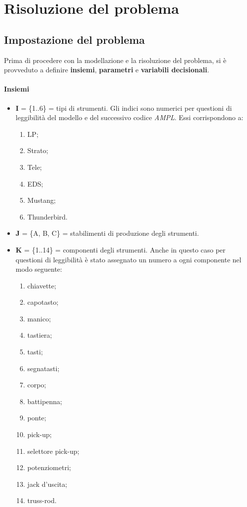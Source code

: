 \newpage
\section{Risoluzione del problema}
\subsection{Impostazione del problema}
Prima di procedere con la modellazione e la risoluzione del problema, si è provveduto a definire \textbf{insiemi}, \textbf{parametri} e \textbf{variabili decisionali}.
\paragraph*{Insiemi} 
\begin{itemize}
\item[] \textbf{I} = \{1..6\} = tipi di strumenti. Gli indici sono numerici per questioni di leggibilità del modello e del successivo codice \textit{AMPL}. Essi corrispondono a:
\begin{enumerate}
\item LP;
\item Strato;
\item Tele;
\item EDS;
\item Mustang;
\item Thunderbird.
\end{enumerate}
\item[] \textbf{J} = \{A, B, C\} = stabilimenti di produzione degli strumenti. 
\item[] \textbf{K} = \{1..14\} = componenti degli strumenti. Anche in questo caso per questioni di leggibilità è stato assegnato un numero a ogni componente nel modo seguente:
\begin{enumerate}
\item chiavette;
\item capotasto;
\item manico;
\item tastiera;
\item tasti;
\item segnatasti;
\item corpo;
\item battipenna;
\item ponte;
\item pick-up;
\item selettore pick-up;
\item potenziometri;
\item jack d'uscita;
\item truss-rod.

\end{enumerate}
\end{itemize}
